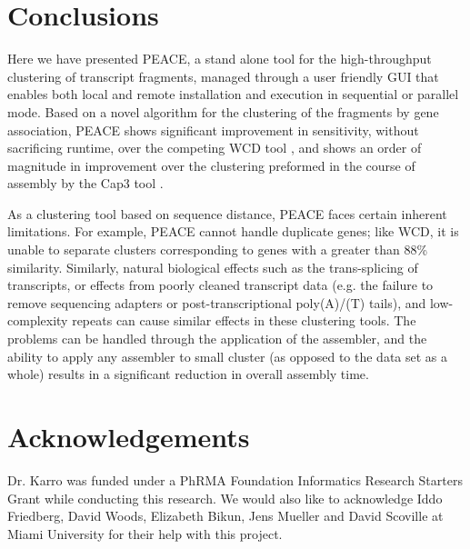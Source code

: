 \documentclass[a4,center,fleqn]{NAR}
\newcommand{\peace} {{\small PEACE}}
\begin{document}
\section{Conclusions}

Here we have presented \peace, a stand alone tool for the
high-throughput clustering of transcript fragments, managed through a
user friendly GUI that enables both local and remote installation and
execution in sequential or parallel mode.  Based on a novel algorithm
for the clustering of the fragments by gene association, \peace\/
shows significant improvement in sensitivity, without sacrificing runtime,
over the competing {\sc WCD} tool \cite{Hazelhurst08a}, and shows an
order of magnitude in improvement over the clustering preformed in the
course of assembly by the {\sc Cap3} tool \cite{Huang99}.

As a clustering tool based on sequence distance, \peace\/ faces
certain inherent limitations. For example, \peace\/ cannot handle
duplicate genes; like {\sc WCD}, it is unable to separate clusters
corresponding to genes with a greater than 88\% similarity.
Similarly, natural biological effects such as the trans-splicing of
transcripts, or effects from poorly cleaned transcript data (e.g. the
failure to remove sequencing adapters or post-transcriptional
poly(A)/(T) tails), and low-complexity repeats can cause similar
effects in these clustering tools.  The problems can be handled
through the application of the assembler, and the ability to apply any
assembler to small cluster (as opposed to the data set as a whole)
results in a significant reduction in overall assembly time.

\section{Acknowledgements}

Dr. Karro was funded under a PhRMA Foundation Informatics Research
Starters Grant while conducting this research.  We would also like to
acknowledge Iddo Friedberg, David Woods, Elizabeth Bikun, Jens Mueller and David
Scoville at Miami University for their help with this project.

\vspace{3mm}


\end{document}
